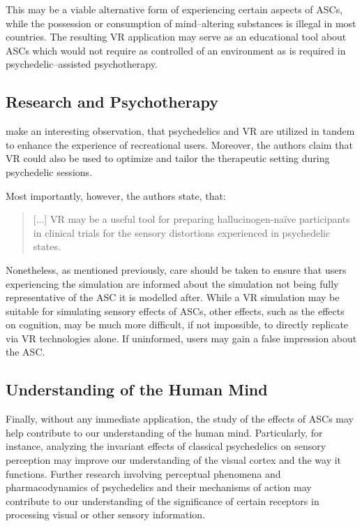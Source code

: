 This may be a viable alternative form of experiencing certain aspects of \acp{ASC}, while the possession or consumption of mind--altering substances is illegal in most countries. The resulting \ac{VR} application may serve as an educational tool about \acp{ASC} which would not require as controlled of an environment as is required in psychedelic--assisted psychotherapy.

\subsection{Research and Psychotherapy}
\textcite{aday2020psychedelics} make an interesting observation, that psychedelics and VR are utilized in tandem to enhance the experience of recreational users. Moreover, the authors claim that VR could also be used to optimize and tailor the therapeutic setting during psychedelic sessions.

Most importantly, however, the authors state, that:

\begin{quote}
    [...] VR may be a useful tool for preparing hallucinogen-naïve participants in clinical trials for the sensory distortions experienced in psychedelic states.
\end{quote}

Nonetheless, as mentioned previously, care should be taken to ensure that users experiencing the simulation are informed about the simulation not being fully representative of the \ac{ASC} it is modelled after. While a \ac{VR} simulation may be suitable for simulating sensory effects of \acp{ASC}, other effects, such as the effects on cognition, may be much more difficult, if not impossible, to directly replicate via \ac{VR} technologies alone. If uninformed, users may gain a false impression about the \ac{ASC}.

\subsection{Understanding of the Human Mind}
Finally, without any immediate application, the study of the effects of \acp{ASC} may help contribute to our understanding of the human mind. Particularly, for instance, analyzing the invariant effects of classical psychedelics on sensory perception may improve our understanding of the visual cortex and the way it functions.
Further research involving perceptual phenomena and pharmacodynamics of psychedelics and their mechanisms of action may contribute to our understanding of the significance of certain receptors in processing visual or other sensory information.

